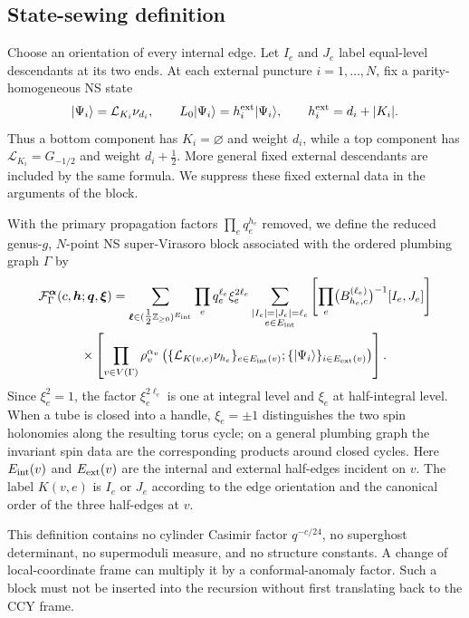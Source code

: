 \documentclass[11pt]{article}
\newcommand{\F}{\mathcal F}
\newcommand{\half}{\tfrac12}
\begin{document}
\subsection{State-sewing definition}

Choose an orientation of every internal edge.  Let \(I_e\) and \(J_e\)
label equal-level descendants at its two ends.  At each external puncture
\(i=1,\ldots,N\), fix a parity-homogeneous NS state
\begin{equation}
 |\Psi_i\rangle=\mathcal L_{K_i}\nu_{d_i},
 \qquad
 L_0|\Psi_i\rangle=h_i^{\rm ext}|\Psi_i\rangle,
 \qquad
 h_i^{\rm ext}=d_i+|K_i|.
 \label{eq:fixed-external-state}
\end{equation}
Thus a bottom component has \(K_i=\varnothing\) and weight \(d_i\), while a
top component has \(\mathcal L_{K_i}=G_{-1/2}\) and weight
\(d_i+\frac12\).  More general fixed external descendants are included by
the same formula.  We suppress these fixed external data in the arguments of
the block.

With the primary propagation factors \(\prod_e q_e^{h_e}\) removed, we
define the reduced genus-\(g\), \(N\)-point NS super-Virasoro block associated
with the ordered plumbing graph \(\Gamma\) by
\begin{multline}
 \F_{\Gamma}^{\bm\alpha}
 (c,\bm h;\bm q,\bm\xi)
 =\sum_{\bm\ell\in(\half\mathbb Z_{\ge0})^{E_{\rm int}}}
 \prod_e q_e^{\ell_e}\xi_e^{2\ell_e}
 \sum_{\substack{|I_e|=|J_e|=\ell_e\\e\in E_{\rm int}}}
 \left[\prod_e
  \bigl(B_{h_e,c}^{(\ell_e)}\bigr)^{-1}[I_e,J_e]
 \right]
 \\
 \times
 \left[\prod_{v\in V(\Gamma)}
  \rho_v^{\alpha_v}
  \left(\{\mathcal L_{K(v,e)}\nu_{h_e}\}_{e\in E_{\rm int}(v)};
        \{|\Psi_i\rangle\}_{i\in E_{\rm ext}(v)}\right)
 \right].
 \label{eq:graph-block}
\end{multline}
Since \(\xi_e^2=1\), the factor \(\xi_e^{2\ell_e}\) is one at integral
level and \(\xi_e\) at half-integral level.  When a tube is closed into a
handle, \(\xi_e=\pm1\) distinguishes the two spin holonomies along the
resulting torus cycle; on a general plumbing graph the invariant spin data
are the corresponding products around closed cycles.  Here
\(E_{\rm int}(v)\) and \(E_{\rm ext}(v)\) are the internal and external
half-edges incident on \(v\).  The label \(K(v,e)\) is \(I_e\) or \(J_e\)
according to the edge orientation and the canonical order of the three
half-edges at \(v\).

This definition contains no cylinder Casimir factor \(q^{-c/24}\), no
superghost determinant, no supermoduli measure, and no structure constants.
A change of local-coordinate frame can multiply it by a conformal-anomaly
factor.  Such a block must not be inserted into the recursion without first
translating back to the CCY frame.
\end{document}
